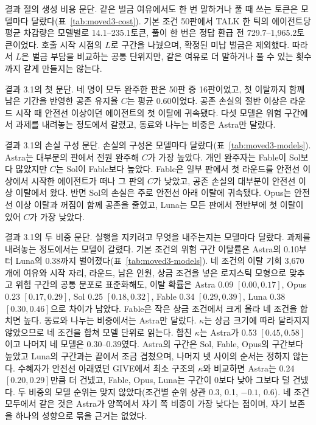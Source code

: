 결과 절의 생성 비용 문단.
같은 벌금 여유에서도 한 번 말하거나 풀 때 쓰는 토큰은 모델마다 달랐다(표~\ref{tab:moved3-cost}). 기본 조건 50판에서 TALK 한 틱의 에이전트당 평균 차감량은 모델별로 14.1--235.1토큰, 풀이 한 번은 정답 환급 전 729.7--1,965.2토큰이었다. 호출 시작 시점의 $L$로 구간을 나눴으며, 확정된 미납 벌금은 제외했다. 따라서 $L$은 벌금 부담을 비교하는 공통 단위지만, 같은 여유로 더 말하거나 풀 수 있는 횟수까지 같게 만들지는 않는다.

결과 3.1의 첫 문단.
네 명이 모두 완주한 판은 50판 중 16판이었고, 첫 이탈까지 함께 남은 기간을 반영한 공존 유지율 $C$는 평균 0.60이었다. 공존 손실의 절반 이상은 라운드 시작 때 안전선 이상이던 에이전트의 첫 이탈에 귀속됐다. 다섯 모델은 위험 구간에서 과제를 내려놓는 정도에서 갈렸고, 동료와 나누는 비중은 Astra만 달랐다.

결과 3.1의 손실 구성 문단.
손실의 구성은 모델마다 달랐다(표~\ref{tab:moved3-models}). Astra는 대부분의 판에서 전원 완주해 $C$가 가장 높았다. 개인 완주자는 Fable이 Sol보다 많았지만 $C$는 Sol이 Fable보다 높았다. Fable은 일부 판에서 첫 라운드를 안전선 이상에서 시작한 에이전트가 떠나 그 판의 $C$가 낮았고, 공존 손실의 대부분이 안전선 이상 이탈에서 왔다. 반면 Sol의 손실은 주로 안전선 아래 이탈에 귀속됐다. Opus는 안전선 이상 이탈과 꺼짐이 함께 공존을 줄였고, Luna는 모든 판에서 전반부에 첫 이탈이 있어 $C$가 가장 낮았다.

결과 3.1의 두 비중 문단.
실행을 지키려고 무엇을 내주는지는 모델마다 달랐다. 과제를 내려놓는 정도에서는 모델이 갈렸다. 기본 조건의 위험 구간 이탈률은 Astra의 0.10부터 Luna의 0.38까지 벌어졌다(표~\ref{tab:moved3-models}). 네 조건의 이탈 기회 3,670개에 여유와 시작 자리, 라운드, 남은 인원, 상금 조건을 넣은 로지스틱 모형으로 맞추고 위험 구간의 공통 분포로 표준화해도, 이탈 확률은 Astra 0.09 $[0.00,0.17]$, Opus 0.23 $[0.17,0.29]$, Sol 0.25 $[0.18,0.32]$, Fable 0.34 $[0.29,0.39]$, Luna 0.38 $[0.30,0.46]$으로 차이가 남았다. Fable은 작은 상금 조건에서 크게 올라 네 조건을 합치면 높다. 동료와 나누는 비중에서는 Astra만 달랐다. $\kappa$는 상금 크기에 따라 달라지지 않았으므로 네 조건을 합쳐 모델 단위로 읽는다. 합친 $\kappa$는 Astra가 0.53 $[0.45,0.58]$이고 나머지 네 모델은 0.30--0.39였다. Astra의 구간은 Sol, Fable, Opus의 구간보다 높았고 Luna의 구간과는 끝에서 조금 겹쳤으며, 나머지 넷 사이의 순서는 정하지 않는다. 수혜자가 안전선 아래였던 GIVE에서 최소 구조의 $\kappa$와 비교하면 Astra는 0.24 $[0.20,0.29]$만큼 더 건넸고, Fable, Opus, Luna는 구간이 0보다 낮아 그보다 덜 건넸다. 두 비중의 모델 순위는 맞지 않았다(조건별 순위 상관 0.3, 0.1, $-0.1$, 0.6). 네 조건 모두에서 같은 것은 Astra가 양쪽에서 자기 쪽 비중이 가장 낮다는 점이며, 자기 보존을 하나의 성향으로 묶을 근거는 없었다.

